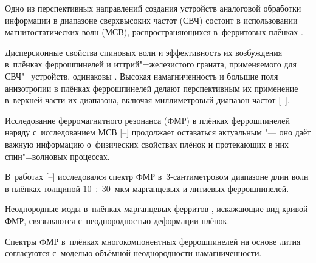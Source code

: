 




\date{28/IX/2013} %














\makerutitle




Одно из перспективных направлений создания устройств аналоговой обработки информации в диапазоне сверхвысоких частот (СВЧ) состоит в использовании магнитостатических волн (МСВ), распространяющихся в~ферритовых плёнках \cite{velik:M1}. 

Дисперсионные свойства спиновых волн и эффективность их возбуждения в~плёнках феррошпинелей и иттрий"=железистого граната, применяемого для СВЧ"=устройств, одинаковы \cite{velik:M1, velik:M2}. Высокая намагниченность и большие поля анизотропии в плёнках феррошпинелей делают перспективным их применение в~верхней части их диапазона, включая миллиметровый диапазон частот  [--].







Исследование ферромагнитного резонанса (ФМР) в плёнках феррошпинелей наряду с~исследованием МСВ [--] продолжает оставаться актуальным "--- оно даёт важную информацию о~физических свойствах плёнок и протекающих в них спин"=волновых процессах. 

В~работах  [--] исследовался спектр ФМР в~3-сантиметровом диапазоне  длин волн в плёнках толщиной $10\div30$~мкм марганцевых и литиевых феррошпинелей. 

Неоднородные моды в~плёнках марганцевых ферритов \cite{velik:M5}, искажающие вид кривой ФМР, связываются с~неоднородностью деформации плёнок. 

Спектры ФМР в~плёнках многокомпонентных феррошпинелей на основе лития \cite{velik:M6} согласуются с~моделью объёмной неоднородности намагниченности. 



